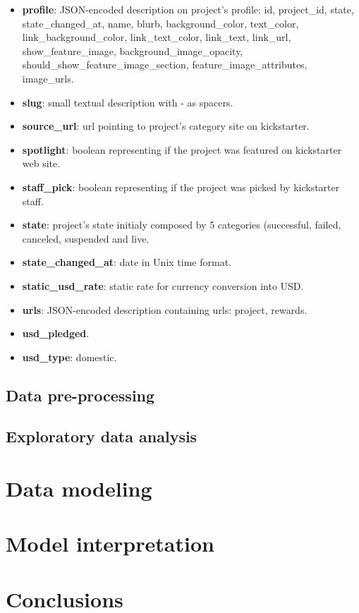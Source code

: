 \documentclass{article}
\begin{document}
{\begin{itemize}
    \item \textbf{profile}: JSON-encoded description on project's profile: id, project\_id, state, state\_changed\_at, name, blurb, background\_color, text\_color, link\_background\_color, link\_text\_color, link\_text, link\_url, show\_feature\_image, background\_image\_opacity, should\_show\_feature\_image\_section, feature\_image\_attributes, image\_urls. 
    \item \textbf{slug}: small textual description with - as spacers.
    \item \textbf{source\_url}: url pointing to project's category site on kickstarter.
    \item \textbf{spotlight}: boolean representing if the project was featured on kickstarter web site.
    \item \textbf{staff\_pick}: boolean representing if the project was picked by kickstarter staff.
    \item \textbf{state}: project's state initialy composed by 5 categories (successful, failed, canceled, suspended and live.
    \item \textbf{state\_changed\_at}: date in Unix time format.
    \item \textbf{static\_usd\_rate}: static rate for currency conversion into USD.
    \item \textbf{urls}: JSON-encoded description containing urls: project, rewards.
    \item \textbf{usd\_pledged}.
    \item \textbf{usd\_type}: domestic.
\end{itemize} 

\subsection{Data pre-processing}
\label{subsec:data_prepro}
\subsection{Exploratory data analysis}
\label{subsec:EDA}
\section{Data modeling}
\label{sec:data_model}
\section{Model interpretation}
\label{sec:interp}
\section{Conclusions}
\label{sec:conclu}

}
\end{document}
